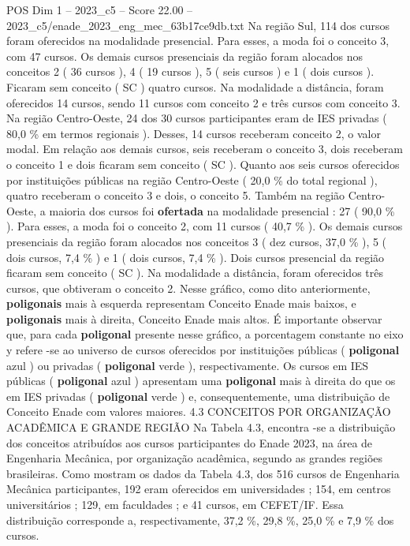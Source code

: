 \begin{textsample}{POS Dim 1 – 2023\_c5 – Score 22.00 – 2023\_c5/enade\_2023\_eng\_mec\_63b17ce9db.txt}
Na região Sul, 114 dos cursos foram oferecidos na modalidade presencial.
Para esses, a moda foi o conceito 3, com 47 cursos.
Os demais cursos presenciais da região foram alocados nos conceitos 2 ( 36 cursos ), 4 ( 19 cursos ), 5 ( seis cursos ) e 1 ( dois cursos ).
Ficaram sem conceito ( SC ) quatro cursos.
Na modalidade a distância, foram oferecidos 14 cursos, sendo 11 cursos com conceito 2 e três cursos com conceito 3.
Na região Centro-Oeste, 24 dos 30 cursos participantes eram de IES privadas ( 80,0 \% em termos regionais ).
Desses, 14 cursos receberam conceito 2, o valor modal.
Em relação aos demais cursos, seis receberam o conceito 3, dois receberam o conceito 1 e dois ficaram sem conceito ( SC ).
Quanto aos seis cursos oferecidos por instituições públicas na região Centro-Oeste ( 20,0 \% do total regional ), quatro receberam o conceito 3 e dois, o conceito 5.
Também na região Centro-Oeste, a maioria dos cursos foi \textbf{ofertada} na modalidade presencial : 27 ( 90,0 \% ).
Para esses, a moda foi o conceito 2, com 11 cursos ( 40,7 \% ).
Os demais cursos presenciais da região foram alocados nos conceitos 3 ( dez cursos, 37,0 \% ), 5 ( dois cursos, 7,4 \% ) e 1 ( dois cursos, 7,4 \% ).
Dois cursos presencial da região ficaram sem conceito ( SC ).
Na modalidade a distância, foram oferecidos três cursos, que obtiveram o conceito 2.
Nesse gráfico, como dito anteriormente, \textbf{poligonais} mais à esquerda representam Conceito Enade mais baixos, e \textbf{poligonais} mais à direita, Conceito Enade mais altos.
É importante observar que, para cada \textbf{poligonal} presente nesse gráfico, a porcentagem constante no eixo y refere -se ao universo de cursos oferecidos por instituições públicas ( \textbf{poligonal} azul ) ou privadas ( \textbf{poligonal} verde ), respectivamente.
Os cursos em IES públicas ( \textbf{poligonal} azul ) apresentam uma \textbf{poligonal} mais à direita do que os em IES privadas ( \textbf{poligonal} verde ) e, consequentemente, uma distribuição de Conceito Enade com valores maiores. 4.3 CONCEITOS POR ORGANIZAÇÃO ACADÊMICA E GRANDE REGIÃO Na Tabela 4.3, encontra -se a distribuição dos conceitos atribuídos aos cursos participantes do Enade 2023, na área de Engenharia Mecânica, por organização acadêmica, segundo as grandes regiões brasileiras.
Como mostram os dados da Tabela 4.3, dos 516 cursos de Engenharia Mecânica participantes, 192 eram oferecidos em universidades ; 154, em centros universitários ; 129, em faculdades ; e 41 cursos, em CEFET/IF.
Essa distribuição corresponde a, respectivamente, 37,2 \%, 29,8 \%, 25,0 \% e 7,9 \% dos cursos.

\end{textsample}
